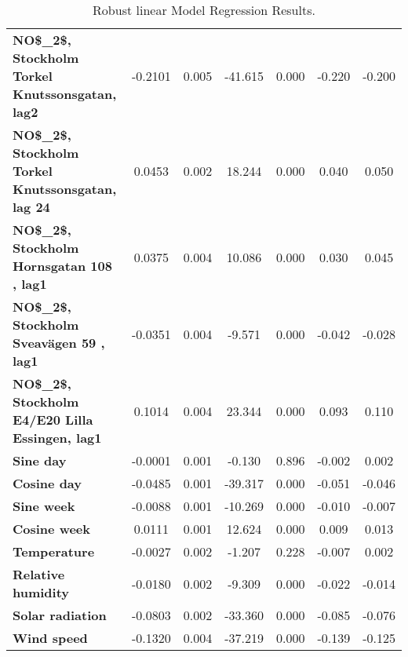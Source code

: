 \begin{landscape}
\begin{table}
\begin{center}
\begin{tabular}{lcccccc}
\textbf{NO\$\_2\$, Stockholm Torkel Knutssonsgatan, lag2}   &      -0.2101  &        0.005     &   -41.615  &         0.000        &       -0.220    &       -0.200     \\
\textbf{NO\$\_2\$, Stockholm Torkel Knutssonsgatan, lag 24} &       0.0453  &        0.002     &    18.244  &         0.000        &        0.040    &        0.050     \\
\textbf{NO\$\_2\$, Stockholm Hornsgatan 108 , lag1}         &       0.0375  &        0.004     &    10.086  &         0.000        &        0.030    &        0.045     \\
\textbf{NO\$\_2\$, Stockholm Sveavägen 59 , lag1}           &      -0.0351  &        0.004     &    -9.571  &         0.000        &       -0.042    &       -0.028     \\
\textbf{NO\$\_2\$, Stockholm E4/E20 Lilla Essingen, lag1}   &       0.1014  &        0.004     &    23.344  &         0.000        &        0.093    &        0.110     \\
\textbf{Sine day}                                           &      -0.0001  &        0.001     &    -0.130  &         0.896        &       -0.002    &        0.002     \\
\textbf{Cosine day}                                         &      -0.0485  &        0.001     &   -39.317  &         0.000        &       -0.051    &       -0.046     \\
\textbf{Sine week}                                          &      -0.0088  &        0.001     &   -10.269  &         0.000        &       -0.010    &       -0.007     \\
\textbf{Cosine week}                                        &       0.0111  &        0.001     &    12.624  &         0.000        &        0.009    &        0.013     \\
\textbf{Temperature}                                        &      -0.0027  &        0.002     &    -1.207  &         0.228        &       -0.007    &        0.002     \\
\textbf{Relative humidity}                                  &      -0.0180  &        0.002     &    -9.309  &         0.000        &       -0.022    &       -0.014     \\
\textbf{Solar radiation}                                    &      -0.0803  &        0.002     &   -33.360  &         0.000        &       -0.085    &       -0.076     \\
\textbf{Wind speed}                                         &      -0.1320  &        0.004     &   -37.219  &         0.000        &       -0.139    &       -0.125     \\
\bottomrule
\end{tabular}
\caption{Robust linear Model Regression Results.}
\label{tab:Robust_table}
\end{center}
\end{table}
\end{landscape}

